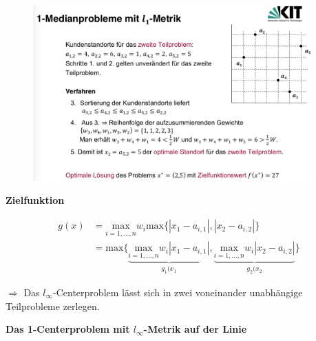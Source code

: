           \begin{exmp}
            
          \end{exmp}

          \begin{figure}[H]
            \centering
            \includegraphics[width=0.95\textwidth]{Images/Loesungsverfahren_fuer_ungewichtete_1_Centreprobleme_Bsp.png}
          \end{figure}


          \par \textbf{Zielfunktion}

          \begin{equation}
            \begin{aligned}
              g(x) &= \underset{i = 1, \dots, n}{\text{max}}w_i\text{max}\{|x_1 - a_{i,1}|, |x_2 - a_{i,2}|\} \\
                   &= \text{max}\{\underbrace{\underset{i = 1,\dots,n}{\text{max}}w_i|x_1 - a_{i,1}|}_{g_1(x_1}, \underbrace{\underset{i = 1,\dots,n}{\text{max}}w_i|x_2 - a_{i,2}|}_{g_2(x_2}\}
            \end{aligned}
          \end{equation}

          \par $\Rightarrow$ Das $l_{\infty}$-Centerproblem lässt sich in zwei voneinander unabhängige Teilprobleme zerlegen.


          \par \textbf{Das 1-Centerproblem mit $l_{\infty}$-Metrik auf der Linie}

